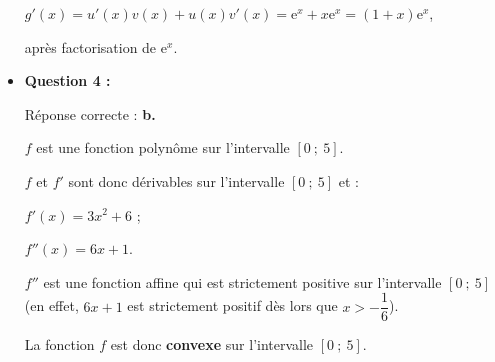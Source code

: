 \begin{corrige}
\begin{itemize}
          $g'(x)=u'(x)v(x)+u(x)v'(x)=\text{e}^{x}+x \text{e}^{x}=(1+x)\text{e}^{x}$,
          \par
          après factorisation de $\text{e}^{x}$.
          \par
          \item \textbf{Question 4 :}
          \par
          Réponse correcte :\quad\textbf{ b.}
          \par
          $f$ est une fonction polynôme sur l'intervalle $[0~;~5]$.
          \par
          $f$ et $f'$ sont donc dérivables sur l'intervalle $[0~;~5]$ et :
          \par
          $f'(x)=3x^2+6$ ;
          \par
          $f''(x)=6x+1$.
          \par
          $f''$ est une fonction affine qui est strictement positive sur l'intervalle $[0~;~5]$ (en effet, $6x+1$ est strictement positif dès lors que $x>-\dfrac{1}{6}$).
          \par
          La fonction $f$ est donc \textbf{convexe} sur l'intervalle $[0~;~5]$.
          \par
     \end{itemize}
\end{corrige}
